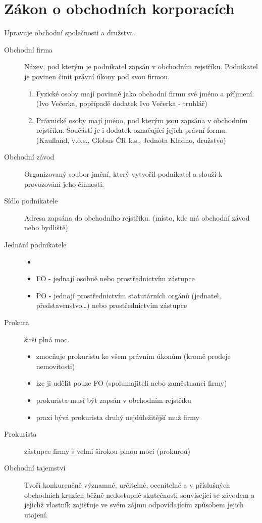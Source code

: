 \documentclass[11pt,a4paper,twoside]{book}
\begin{document}
	\section*{Zákon o obchodních korporacích}
	Upravuje obchodní společnosti a družstva.
		\begin{description}
			\item[Obchodní firma] Název, pod kterým je podnikatel zapsán v obchodním rejstříku. Podnikatel je povinen činit právní úkony pod svou firmou.
				\begin{enumerate}
					\item Fyzické osoby mají povinně jako obchodní firmu své jméno a příjmení. (Ivo Večerka, popřípadě dodatek Ivo Večerka - truhlář)
					\item Právnické osoby mají jméno, pod kterým jsou zapsána v obchodním rejstříku. Součástí je i dodatek označující jejich právní formu. (Kaufland, v.o.s., Globus ČR k.s., Jednota Kladno, družstvo)
				\end{enumerate}
			\item[Obchodní závod] Organizovaný soubor jmění, který vytvořil podnikatel a slouží k provozování jeho činnosti.
			\item[Sídlo podnikatele] Adresa zapsána do obchodního rejstříku. (místo, kde má obchodní závod nebo bydliště)
			\item[Jednání podnikatele]
				\begin{itemize}
					\item []
					\item FO - jednají osobně nebo prostřednictvím zástupce
					\item PO - jednají prostřednictvím statutárních orgánů (jednatel, představenstvo\ldots) nebo prostřednictvím zástupce
				\end{itemize}
			\item[Prokura] širší plná moc.
				\begin{itemize}
					\item zmocňuje prokuristu ke všem právním úkonům (kromě prodeje nemovitosti)
					\item lze ji udělit pouze FO (spolumajiteli nebo zaměstnanci firmy)
					\item prokurista musí být zapsán v obchodním rejstříku
					\item praxi bývá prokurista druhý nejdůležitější muž firmy
				\end{itemize}
			\item[Prokurista] zástupce firmy s velmi širokou plnou mocí (prokurou)
			\item[Obchodní tajemství] Tvoří konkurenčně významné, určitelné, ocenitelné a v příslušných obchodních kruzích běžně nedostupné skutečnosti související se závodem a jejichž vlastník zajišťuje ve svém zájmu odpovídajícím způsobem jejich utajení.

\end{description}
\end{document}
